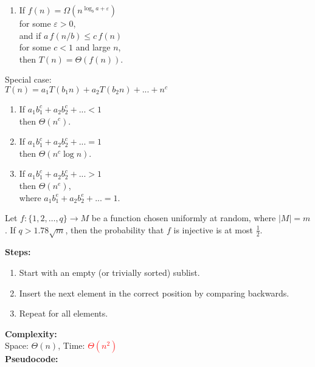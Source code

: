 \documentclass[a4paper,landscape]{article}
\newcommand{\timecomplexity}[1]{\textcolor{red}{#1}}
\begin{document}
\begin{multicols}{7}
\begin{enumerate}[noitemsep, topsep=0pt]
    \item If \( f(n) = \Omega(n^{\log_b a + \varepsilon}) \) \\ for some \( \varepsilon > 0 \),\\
          and if \( a\,f(n/b) \leq c\,f(n) \) \\ for some \( c < 1 \) and large \( n \),\\
          then \( T(n) = \Theta(f(n)) \).
\end{enumerate}
\tcblower
Special case:\\
\(T(n) = a_1T(b_1n) + a_2T(b_2n) + ... + n^c\)
\begin{enumerate}[noitemsep, topsep=0pt]
    \item If \(a_1b_1^c + a_2b_2^c + ...  < 1 \) \\ \hspace*{2mm} then \( \Theta(n^c)\).
    \item If \(a_1b_1^c + a_2b_2^c + ...  = 1\) \\ \hspace*{2mm} then \( \Theta(n^c \log n)\).
    \item If \(a_1b_1^c + a_2b_2^c + ...  > 1 \) \\ \hspace*{2mm} then \( \Theta(n^e)\), \\ \hspace*{2mm} where \(a_1b_1^e + a_2b_2^e + ... = 1\).
\end{enumerate}
\endtcolorbox

\tcolorbox[mybox={Injective Functions}] 
Let $f : \{1, 2, \dots, q\} \to M$ be a function chosen uniformly at random, where $|M| = m$.  
If $q > 1.78\sqrt{m}$, then the probability that $f$ is injective is at most $\frac{1}{2}$.
\endtcolorbox

\tcolorbox[mybox={Insertion Sort}]
\textbf{Steps:}
\begin{enumerate}[noitemsep, topsep=0pt]
    \item Start with an empty (or trivially sorted) sublist.
    \item Insert the next element in the correct position by comparing backwards.
    \item Repeat for all elements.
\end{enumerate}
\textbf{Complexity:}\\
Space: \( \Theta(n) \), Time: \timecomplexity{\( \Theta(n^2) \)}\\
\textbf{Pseudocode:}
\noindent %
\endtcolorbox


\end{multicols}
\end{document}

